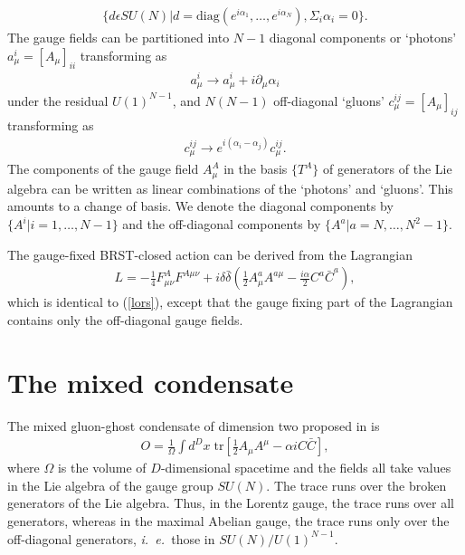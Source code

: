 \documentclass[a4paper,a4paper]{article}
\begin{document}
\begin{gather}
\{ d \epsilon SU(N) | d = \mathrm{diag} (e^{i\alpha_1}, \dots, e^{i\alpha_N}), \Sigma_i \alpha_i =0 \}.
\end{gather}
The gauge fields can be partitioned into $N-1$ diagonal components or `photons' $a^{i}_{\mu} = [A_{\mu}]_{ii}$ transforming as
\begin{gather}
a^{i}_{\mu} \rightarrow a^{i}_{\mu} + i\partial_{\mu} \alpha_i
\end{gather}
under the residual $U(1)^{N-1}$, and $N(N-1)$ off-diagonal `gluons' $c^{ij}_{\mu} = [A_{\mu}]_{ij}$ transforming as
\begin{gather} \label{cgt}
c^{ij}_{\mu} \rightarrow e^{i(\alpha_i - \alpha_j)} c^{ij}_{\mu}.
\end{gather}
The components of the gauge field $A^{A}_{\mu}$ in the basis $\{ T^A \}$ of generators of the Lie algebra can be written as linear combinations of the `photons' and `gluons'. This amounts to a change of basis. We denote the diagonal components by $\{ A^{i}| i=1,\dots, N-1\}$ and the off-diagonal components by $\{ A^{a} | a = N,\dots, N^2-1 \}$.

The gauge-fixed BRST-closed action can be derived from the Lagrangian \cite{Kondo:1998pc,Kondo:1998nw,Kondo:1998sr}
\begin{gather} \label{mags}
L = -\frac{1}{4} F_{\mu\nu}^{A} F^{A\mu\nu}
+i\delta \bar{\delta} (\frac{1}{2}A_{\mu}^{a}A^{a\mu} - \frac{i\alpha}{2} C^{a} \bar{C}^{a}),
\end{gather}
which is identical to (\ref{lors}), except that the gauge fixing part of the Lagrangian contains only the off-diagonal gauge fields.
%
%
%
%
%
%
\section{The mixed condensate}
\label{cond}
The mixed gluon-ghost condensate of dimension two proposed in \cite{Kondo:2001nq} is
\begin{gather} \label{O}
O = \frac{1}{\Omega} \int d^D x \; 
\mathrm{tr} \left[ \frac{1}{2} A_{\mu}  A^{\mu} - \alpha i C \bar{C} \right],
\end{gather}
where $\Omega$ is the volume of $D$-dimensional spacetime and the fields all take values in the Lie algebra of the gauge group $SU(N)$. The trace runs over the broken generators of the Lie algebra. Thus, in the Lorentz gauge, the trace runs over all generators, whereas in the maximal Abelian gauge, the trace runs only over the off-diagonal generators, \emph{i.\ e.\ }those in $SU(N)/U(1)^{N-1}$. 
\end{document}
